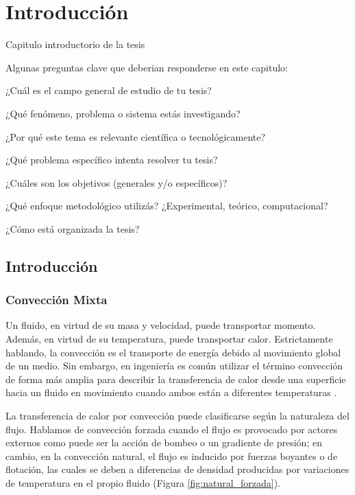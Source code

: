 \chapter{Introducción}
\label{intro}

Capitulo introductorio de la tesis


Algunas preguntas clave que deberian responderse en este capitulo:

¿Cuál es el campo general de estudio de tu tesis?

¿Qué fenómeno, problema o sistema estás investigando?

¿Por qué este tema es relevante científica o tecnológicamente?

¿Qué problema específico intenta resolver tu tesis?

¿Cuáles son los objetivos (generales y/o específicos)?

¿Qué enfoque metodológico utilizás? ¿Experimental, teórico, computacional?

¿Cómo está organizada la tesis?

\newpage
\section{Introducción}

\subsection*{Convección Mixta}

Un fluido, en virtud de su masa y velocidad, puede transportar momento. Además, en virtud de su temperatura, puede transportar calor. Estrictamente hablando, la convección es el transporte de energía debido al movimiento global de un medio. Sin embargo, en ingeniería es común utilizar el término convección de forma más amplia para describir la transferencia de calor desde una superficie hacia un fluido en movimiento cuando ambos están a diferentes temperaturas \cite{cengelheat,incropera}. 

La transferencia de calor por convección puede clasificarse según la naturaleza del flujo. Hablamos de convección forzada cuando el flujo es provocado por actores externos como puede ser la acción de bombeo o un gradiente de presión; en cambio, en la convección natural, el flujo es inducido por fuerzas boyantes o de flotación, las cuales se deben a diferencias de densidad producidas por variaciones de temperatura en el propio fluido (Figura \ref{fig:natural_forzada}).

